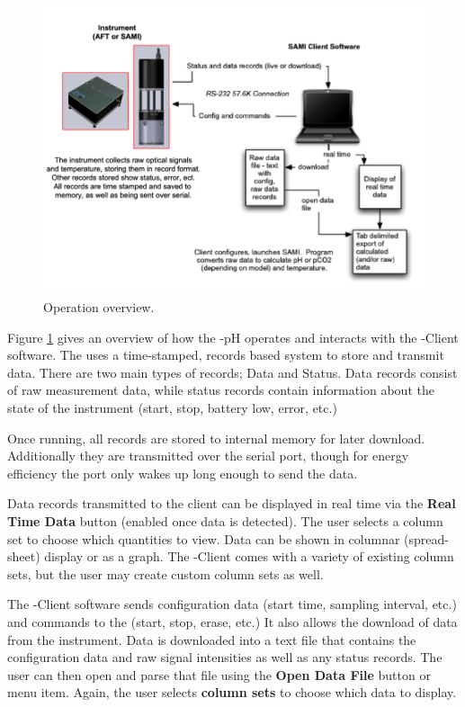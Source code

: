 \begin{figure}[ht]
\centering
\includegraphics[width=1.0\textwidth]{figs/OperationFig.png}
\caption{Operation overview.}
\label{fig:OperationFig}
\end{figure}


Figure \ref{fig:OperationFig} gives an overview of how the \instType{}-pH operates and interacts with the \instType{}-Client software.  The \instType{} uses a time-stamped, records based system to store and transmit data.  There are two main types of records; Data and Status.  Data records consist of raw measurement data, while status records contain information about the state of the instrument (start, stop, battery low, error, etc.)

Once running, all records are stored to internal memory for later download.  Additionally they are transmitted over the serial port, though for energy efficiency the port only wakes up long enough to send the data. 

Data records transmitted to the client can be displayed in real time via the \textbf{Real Time Data} button (enabled once data is detected). The user selects a column set to choose which quantities to view.  Data can be shown in columnar (spread-sheet) display or as a graph.  The \instType{}-Client comes with a variety of existing column sets, but the user may create custom column sets as well.

The \instType{}-Client software sends configuration data (start time, sampling interval, etc.) and commands to the \instType{} (start, stop, erase, etc.)  It also allows the download of data from the instrument.  Data is downloaded into a text file that contains the configuration data and raw signal intensities as well as any status records.  The user can then open and parse that file using the \textbf{Open Data File} button or menu item.  Again, the user selects \textbf{column sets} to choose which data to display.

